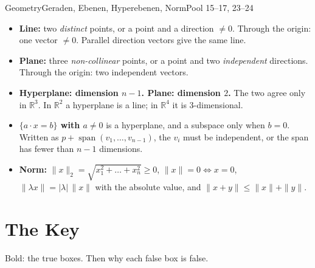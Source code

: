 \documentclass{kaelearn}
\begin{document}
\begin{panel}[unbreakable]{Geometry}{Geraden, Ebenen, Hyperebenen, Norm}{Pool 15--17, 23--24}
\begin{itemize}
  \item \textbf{Line:} two \emph{distinct} points, or a point and a direction $\neq0$. Through the
        origin: one vector $\neq0$. Parallel direction vectors give the same line.
  \item \textbf{Plane:} three \emph{non-collinear} points, or a point and two \emph{independent}
        directions. Through the origin: two independent vectors.
  \item \textbf{Hyperplane: dimension $n-1$. Plane: dimension $2$.} The two agree only in
        $\mathbb R^3$. In $\mathbb R^2$ a hyperplane is a line; in $\mathbb R^4$ it is
        3-dimensional.
  \item \textbf{$\{a\cdot x=b\}$ with $a\neq0$} is a hyperplane, and a subspace only when $b=0$.
        Written as $p+\operatorname{span}(v_1,\dots,v_{n-1})$, the $v_i$ must be independent, or the
        span has fewer than $n-1$ dimensions.
  \item \textbf{Norm:} $\|x\|_2=\sqrt{x_1^2+\dots+x_n^2}\ge0$, $\|x\|=0\iff x=0$,
        $\|\lambda x\|=|\lambda|\,\|x\|$ with the absolute value, and $\|x+y\|\le\|x\|+\|y\|$.
\end{itemize}
\end{panel}

\section{The Key}

Bold: the true boxes. Then why each false box is false.
\end{document}
